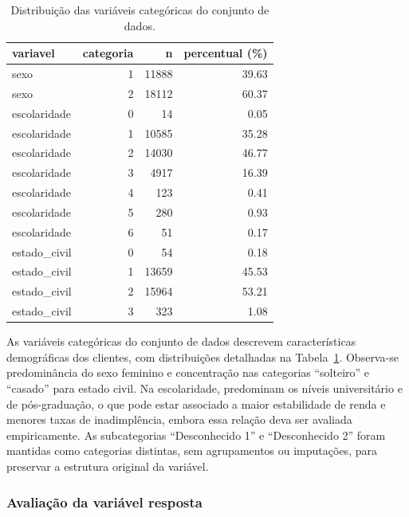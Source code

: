 \documentclass[
  brazilian,
  12pt,
  letterpaper,
  DIV=11,
  numbers=noendperiod]{scrartcl}
\begin{document}
{

\begin{longtable}[]{@{}lrrr@{}}

\caption{\label{tbl-categoricas-default}Distribuição das variáveis
categóricas do conjunto de dados.}

\tabularnewline

\toprule\noalign{}
variavel & categoria & n & percentual (\%) \\
\midrule\noalign{}
\endhead
\bottomrule\noalign{}
\endlastfoot
sexo & 1 & 11888 & 39.63 \\
sexo & 2 & 18112 & 60.37 \\
escolaridade & 0 & 14 & 0.05 \\
escolaridade & 1 & 10585 & 35.28 \\
escolaridade & 2 & 14030 & 46.77 \\
escolaridade & 3 & 4917 & 16.39 \\
escolaridade & 4 & 123 & 0.41 \\
escolaridade & 5 & 280 & 0.93 \\
escolaridade & 6 & 51 & 0.17 \\
estado\_civil & 0 & 54 & 0.18 \\
estado\_civil & 1 & 13659 & 45.53 \\
estado\_civil & 2 & 15964 & 53.21 \\
estado\_civil & 3 & 323 & 1.08 \\

\end{longtable}

}

As variáveis categóricas do conjunto de dados descrevem características
demográficas dos clientes, com distribuições detalhadas na
Tabela~\ref{tbl-categoricas-default}. Observa-se predominância do sexo
feminino e concentração nas categorias ``solteiro'' e ``casado'' para
estado civil. Na escolaridade, predominam os níveis universitário e de
pós-graduação, o que pode estar associado a maior estabilidade de renda
e menores taxas de inadimplência, embora essa relação deva ser avaliada
empiricamente. As subcategorias ``Desconhecido 1'' e ``Desconhecido 2''
foram mantidas como categorias distintas, sem agrupamentos ou
imputações, para preservar a estrutura original da variável.

\subsubsection{Avaliação da variável
resposta}\label{avaliauxe7uxe3o-da-variuxe1vel-resposta}
\end{document}
